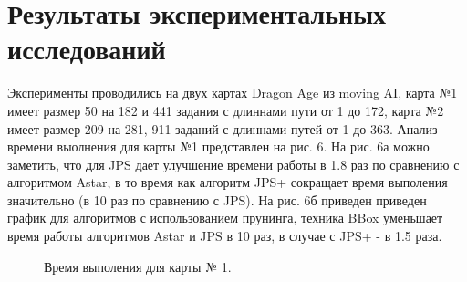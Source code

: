 \documentclass{physlab}
\begin{document}
\section{Результаты экспериментальных исследований}
Эксперименты проводились на двух картах Dragon Age из moving AI, карта №1 имеет размер 50 на 182 и 441 задания с длиннами пути от 1 до 172, карта №2 имеет размер 209 на 281, 911 заданий с длиннами путей от 1 до 363. Анализ времени выолнения для карты №1 представлен на рис. 6. На рис. 6а можно заметить, что для JPS дает улучшение времени работы в 1.8 раз по сравнению с алгоритмом Astar, в то время как алгоритм JPS+ сокращает время выполения значительно (в 10 раз по сравнению с JPS). На рис. 6б приведен приведен график для алгоритмов  с использованием прунинга, техника BBox уменьшает время работы алгоритмов Astar и JPS в 10 раз, в случае с JPS+ - в 1.5 раза.  
\begin{figure}[H]
\begin{minipage}[h]{0.55\linewidth}
\end{minipage}
\hfill
\begin{minipage}[h]{0.52\linewidth}
\end{minipage}
\caption{Время выполения для карты № 1.}
\end{figure} 
\end{document}
